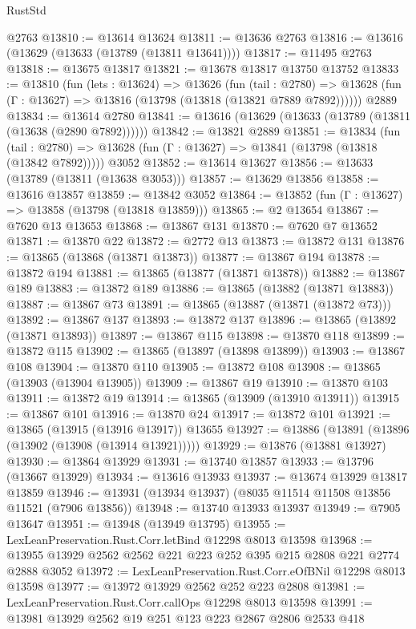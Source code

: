 \begin{lexlean}{RustStd}
\begin{coremodule}
    @2763
@13810 := @13614 @13624
@13811 := @13636 @2763
@13816 := @13616 (@13629 (@13633 (@13789 (@13811 @13641))))
@13817 := @11495 @2763
@13818 := @13675 @13817
@13821 := @13678 @13817 @13750 @13752
@13833 := @13810
    (fun (lets : @13624) =>
    @13626
      (fun (tail : @2780) =>
      @13628 (fun (Γ : @13627) => @13816 (@13798 (@13818 (@13821 @7889 @7892))))))
    @2889
@13834 := @13614 @2780
@13841 := @13616 (@13629 (@13633 (@13789 (@13811 (@13638 (@2890 @7892))))))
@13842 := @13821 @2889
@13851 := @13834
    (fun (tail : @2780) => @13628 (fun (Γ : @13627) => @13841 (@13798 (@13818 (@13842 @7892)))))
    @3052
@13852 := @13614 @13627
@13856 := @13633 (@13789 (@13811 (@13638 @3053)))
@13857 := @13629 @13856
@13858 := @13616 @13857
@13859 := @13842 @3052
@13864 := @13852 (fun (Γ : @13627) => @13858 (@13798 (@13818 @13859)))
@13865 := @2 @13654
@13867 := @7620 @13 @13653
@13868 := @13867 @131
@13870 := @7620 @7 @13652
@13871 := @13870 @22
@13872 := @2772 @13
@13873 := @13872 @131
@13876 := @13865 (@13868 (@13871 @13873))
@13877 := @13867 @194
@13878 := @13872 @194
@13881 := @13865 (@13877 (@13871 @13878))
@13882 := @13867 @189
@13883 := @13872 @189
@13886 := @13865 (@13882 (@13871 @13883))
@13887 := @13867 @73
@13891 := @13865 (@13887 (@13871 (@13872 @73)))
@13892 := @13867 @137
@13893 := @13872 @137
@13896 := @13865 (@13892 (@13871 @13893))
@13897 := @13867 @115
@13898 := @13870 @118
@13899 := @13872 @115
@13902 := @13865 (@13897 (@13898 @13899))
@13903 := @13867 @108
@13904 := @13870 @110
@13905 := @13872 @108
@13908 := @13865 (@13903 (@13904 @13905))
@13909 := @13867 @19
@13910 := @13870 @103
@13911 := @13872 @19
@13914 := @13865 (@13909 (@13910 @13911))
@13915 := @13867 @101
@13916 := @13870 @24
@13917 := @13872 @101
@13921 := @13865 (@13915 (@13916 @13917)) @13655
@13927 := @13886 (@13891 (@13896 (@13902 (@13908 (@13914 @13921)))))
@13929 := @13876 (@13881 @13927)
@13930 := @13864 @13929
@13931 := @13740 @13857
@13933 := @13796 (@13667 @13929)
@13934 := @13616 @13933
@13937 := @13674 @13929 @13817 @13859
@13946 := @13931 (@13934 @13937) (@8035 @11514 @11508 @13856 @11521 (@7906 @13856))
@13948 := @13740 @13933 @13937
@13949 := @7905 @13647
@13951 := @13948 (@13949 @13795)
@13955 := LexLeanPreservation.Rust.Corr.letBind @12298 @8013 @13598
@13968 := @13955 @13929 @2562 @2562 @221 @223 @252 @395 @215 @2808 @221 @2774 @2888 @3052
@13972 := LexLeanPreservation.Rust.Corr.eOfBNil @12298 @8013 @13598
@13977 := @13972 @13929 @2562 @252 @223 @2808
@13981 := LexLeanPreservation.Rust.Corr.callOps @12298 @8013 @13598
@13991 := @13981 @13929 @2562 @19 @251 @123 @223 @2867 @2806 @2533 @418

\end{coremodule}
\end{lexlean}
